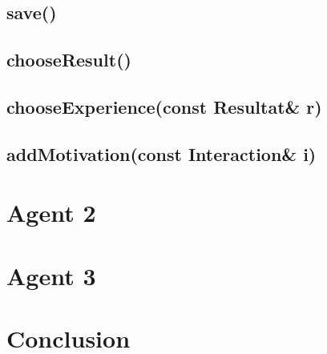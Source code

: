 \documentclass[11pt]{article}
\begin{document}
    \subsection{save()}
    \subsection{chooseResult()}
    \subsection{chooseExperience(const Resultat\& r)}
    \subsection{addMotivation(const Interaction\& i)}
    
  \section{Agent 2}
  \section{Agent 3}
  \section{Conclusion}
\end{document}
